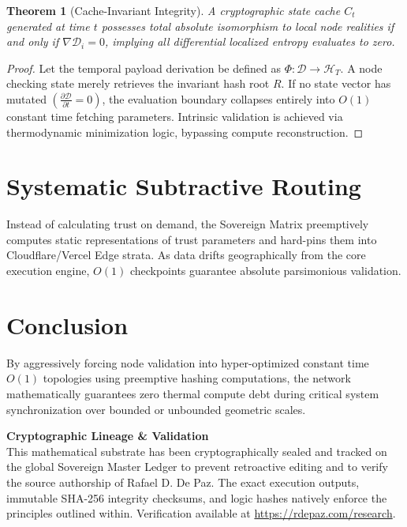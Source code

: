 \documentclass[12pt, a4paper]{article}
\theoremstyle{plain}
\newtheorem{theorem}{Theorem}[section]
\theoremstyle{definition}
\begin{document}
\begin{theorem}[Cache-Invariant Integrity]
A cryptographic state cache $C_t$ generated at time $t$ possesses total absolute isomorphism to local node realities if and only if $\nabla \mathcal{D}_{i} = 0$, implying all differential localized entropy evaluates to zero.
\end{theorem}
\begin{proof}
Let the temporal payload derivation be defined as $\Phi : \mathcal{D} \to \mathcal{H}_{T}$. A node checking state merely retrieves the invariant hash root $R$. If no state vector has mutated $\left( \frac{\partial \mathcal{D}}{\partial t} = 0 \right)$, the evaluation boundary collapses entirely into $O(1)$ constant time fetching parameters. Intrinsic validation is achieved via thermodynamic minimization logic, bypassing compute reconstruction.
\end{proof}

\section{Systematic Subtractive Routing}
Instead of calculating trust on demand, the Sovereign Matrix preemptively computes static representations of trust parameters and hard-pins them into Cloudflare/Vercel Edge strata. As data drifts geographically from the core execution engine, $O(1)$ checkpoints guarantee absolute parsimonious validation.

\section{Conclusion}
By aggressively forcing node validation into hyper-optimized constant time $O(1)$ topologies using preemptive hashing computations, the network mathematically guarantees zero thermal compute debt during critical system synchronization over bounded or unbounded geometric scales.





\vspace{3em}
\noindent\hrulefill
\vspace{1em}

\noindent\textbf{Cryptographic Lineage \& Validation}\\
This mathematical substrate has been cryptographically sealed and tracked on the global Sovereign Master Ledger to prevent retroactive editing and to verify the source authorship of Rafael D. De Paz. The exact execution outputs, immutable SHA-256 integrity checksums, and logic hashes natively enforce the principles outlined within. Verification available at \url{https://rdepaz.com/research}.
\end{document}
